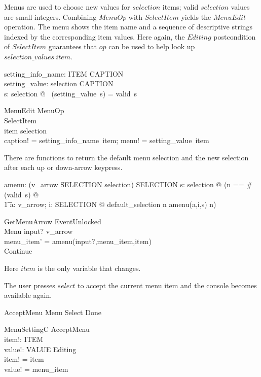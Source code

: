 \documentclass{article}
\begin{document}
Menus are used to choose new values for $selection$ items; valid
$selection$ values are small integers.  Combining $MenuOp$ with
$SelectItem$ yields the $MenuEdit$ operation. The menu shows the item
name and a sequence of descriptive strings indexed by the
corresponding item values. Here again, the $Editing$ postcondition of
$SelectItem$ guarantees that $op$ can be used to help look up
$selection\_values~item$.

\begin{axdef}
	setting\_info\_name: ITEM \fun CAPTION \\
	setting\_value: selection \fun \iseq CAPTION \\
\where
	\forall s: selection @ \dom~(setting\_value~s) = valid~s
\end{axdef}

\begin{schema}{MenuEdit}
	MenuOp \\
	SelectItem \\
\where
	item \in selection \\
	caption! = setting\_info\_name~item;
	menu! = setting\_value~item
\end{schema}
There are functions to return the default menu selection and the new
selection after each up or down-arrow keypress.

\begin{axdef}
	amenu: (v\_arrow \cross SELECTION \cross selection) \fun SELECTION
\where
\forall s: selection @ (\LET n == \# (valid~s) @ \\
\t1	\forall a: v\_arrow; i: SELECTION @ default\_selection \leq n \land amenu(a,i,s) \leq n)
\end{axdef}

\begin{schema}{GetMenuArrow}
	EventUnlocked \\
	\Delta Menu
\where
	input? \in v\_arrow \\
	menu\_item' = amenu(input?,menu\_item,item) \\
	Continue 
\end{schema}
Here $item$ is the only variable that changes.

The user presses $select$ to accept the current menu item and the
console becomes available again.

\begin{zed} AcceptMenu  Menu \land Select \land Done \end{zed}

\begin{schema}{MenuSettingC}
	AcceptMenu \\
	item!: ITEM \\
	value!: VALUE
\where
	Editing \\
	item! = item \\
	value! = menu\_item
\end{schema}
\end{document}
